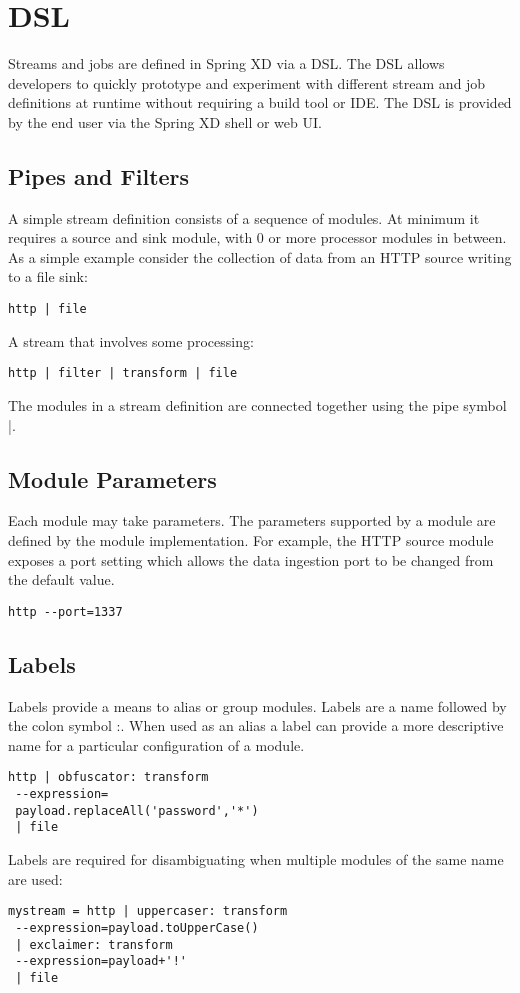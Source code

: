 \section{DSL}
\label{sec:DSL}
Streams and jobs are defined in Spring XD via a DSL\cite{dsl}. The DSL allows developers
to quickly prototype and experiment with different stream and job definitions at
runtime without requiring a build tool or IDE. The DSL is provided by the end user
via the Spring XD shell or web UI.

\subsection {Pipes and Filters}
A simple stream definition consists of a sequence of modules. At minimum it requires a
source and sink module, with 0 or more processor modules in between. As a simple example
consider the collection of data from an HTTP source writing to a file sink:

\begin{lstlisting}
http | file
\end{lstlisting}

A stream that involves some processing:

\begin{lstlisting}
http | filter | transform | file
\end{lstlisting}

The modules in a stream definition are connected together using the pipe symbol |.

\subsection{Module Parameters}
Each module may take parameters. The parameters supported by a module are defined by
the module implementation. For example, the HTTP source module exposes a port setting
which allows the data ingestion port to be changed from the default value.

\begin{lstlisting}
http --port=1337
\end{lstlisting}

\subsection{Labels}

Labels provide a means to alias or group modules. Labels are a name followed
by the colon symbol :. When used as an alias a label can provide a more descriptive
name for a particular configuration of a module.

\begin{lstlisting}
http | obfuscator: transform
 --expression=
 payload.replaceAll('password','*')
 | file
\end{lstlisting}

Labels are required for disambiguating when multiple modules of the same name are used:

\begin{lstlisting}
mystream = http | uppercaser: transform
 --expression=payload.toUpperCase()
 | exclaimer: transform 
 --expression=payload+'!'
 | file
\end{lstlisting}

